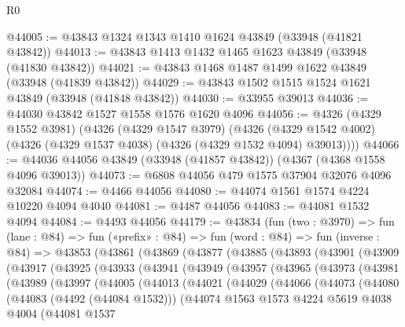 \begin{lexlean}{R0}
\begin{coremodule}
@44005 := @43843 @1324 @1343 @1410 @1624 @43849 (@33948 (@41821 @43842))
@44013 := @43843 @1413 @1432 @1465 @1623 @43849 (@33948 (@41830 @43842))
@44021 := @43843 @1468 @1487 @1499 @1622 @43849 (@33948 (@41839 @43842))
@44029 := @43843 @1502 @1515 @1524 @1621 @43849 (@33948 (@41848 @43842))
@44030 := @33955 @39013
@44036 := @44030 @43842 @1527 @1558 @1576 @1620 @4096
@44056 := @4326
    (@4329 @1552 @3981)
    (@4326
      (@4329 @1547 @3979)
      (@4326 (@4329 @1542 @4002) (@4326 (@4329 @1537 @4038) (@4326 (@4329 @1532 @4094) @39013))))
@44066 := @44036 @44056 @43849 (@33948 (@41857 @43842)) (@4367 (@4368 @1558 @4096 @39013))
@44073 := @6808 @44056 @479 @1575 @37904 @32076 @4096 @32084
@44074 := @4466 @44056
@44080 := @44074 @1561 @1574 @4224 @10220 @4094 @4040
@44081 := @4487 @44056
@44083 := @44081 @1532 @4094
@44084 := @4493 @44056
@44179 := @43834
    (fun (two : @3970) =>
    fun (lane : @84) =>
    fun («prefix» : @84) =>
    fun (word : @84) =>
    fun (inverse : @84) =>
    @43853
      (@43861
        (@43869
          (@43877
            (@43885
              (@43893
                (@43901
                  (@43909
                    (@43917
                      (@43925
                        (@43933
                          (@43941
                            (@43949
                              (@43957
                                (@43965
                                  (@43973
                                    (@43981
                                      (@43989
                                        (@43997
                                          (@44005
                                            (@44013
                                              (@44021
                                                (@44029
                                                  (@44066
                                                    (@44073
                                                      (@44080
                                                        (@44083 (@4492 (@44084 @1532)))
                                                        (@44074
                                                          @1563
                                                          @1573
                                                          @4224
                                                          @5619
                                                          @4038
                                                          @4004
                                                          (@44081
                                                            @1537

\end{coremodule}
\end{lexlean}
